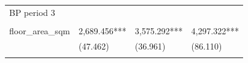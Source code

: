 \documentclass[]{book}
\begin{document}
\begin{longtable}[]{@{}llll@{}}
\begin{minipage}[t]{0.22\columnwidth}
BP period 3\strut
\end{minipage}\tabularnewline
\begin{minipage}[t]{0.18\columnwidth}\raggedright\strut
\strut
\end{minipage} & \begin{minipage}[t]{0.24\columnwidth}\raggedright\strut
\strut
\end{minipage} & \begin{minipage}[t]{0.24\columnwidth}\raggedright\strut
\strut
\end{minipage} & \begin{minipage}[t]{0.22\columnwidth}\raggedright\strut
\strut
\end{minipage}\tabularnewline
\begin{minipage}[t]{0.18\columnwidth}\raggedright\strut
floor\_area\_sqm\strut
\end{minipage} & \begin{minipage}[t]{0.24\columnwidth}\raggedright\strut
2,689.456***\strut
\end{minipage} & \begin{minipage}[t]{0.24\columnwidth}\raggedright\strut
3,575.292***\strut
\end{minipage} & \begin{minipage}[t]{0.22\columnwidth}\raggedright\strut
4,297.322***\strut
\end{minipage}\tabularnewline
\begin{minipage}[t]{0.18\columnwidth}\raggedright\strut
\strut
\end{minipage} & \begin{minipage}[t]{0.24\columnwidth}\raggedright\strut
(47.462)\strut
\end{minipage} & \begin{minipage}[t]{0.24\columnwidth}\raggedright\strut
(36.961)\strut
\end{minipage} & \begin{minipage}[t]{0.22\columnwidth}\raggedright\strut
(86.110)\strut
\end{minipage}\tabularnewline
\begin{minipage}[t]{0.18\columnwidth}\raggedright\strut
\strut
\end{minipage} & \begin{minipage}[t]{0.24\columnwidth}\raggedright\strut
\strut
\end{minipage} & \begin{minipage}[t]{0.24\columnwidth}\raggedright\strut
\strut
\end{minipage} & \begin{minipage}[t]{0.22\columnwidth}\raggedright\strut

\end{minipage}
\end{longtable}
\end{document}
